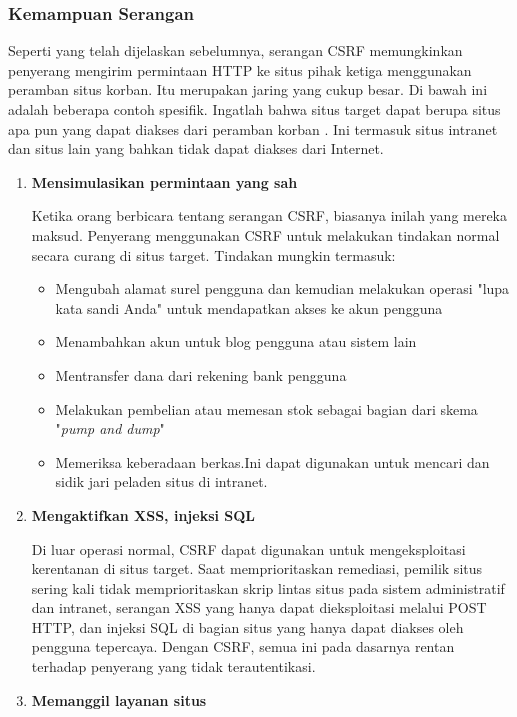 \documentclass{article}
\begin{document}
\begin{enumerate}
\end{enumerate}

\subsubsection{Kemampuan Serangan}
Seperti yang telah dijelaskan sebelumnya, serangan CSRF memungkinkan penyerang mengirim permintaan HTTP ke situs pihak ketiga menggunakan peramban situs korban. Itu merupakan jaring yang cukup besar. Di bawah ini adalah beberapa contoh spesifik. Ingatlah bahwa situs target dapat berupa situs apa pun yang dapat diakses dari peramban korban \cite{blatz2007csrf}. Ini termasuk situs intranet dan situs lain yang bahkan tidak dapat diakses dari Internet.
\begin{enumerate}
\item \textbf{Mensimulasikan permintaan yang sah}

Ketika orang berbicara tentang serangan CSRF, biasanya inilah yang mereka maksud. Penyerang menggunakan CSRF untuk melakukan tindakan normal secara curang di situs target. Tindakan mungkin termasuk: 
\begin{itemize}
\item Mengubah alamat surel pengguna dan kemudian melakukan operasi "lupa kata sandi Anda" untuk mendapatkan akses ke akun pengguna 
\item Menambahkan akun untuk blog pengguna atau sistem lain 
\item Mentransfer dana dari rekening bank pengguna 
\item Melakukan pembelian atau memesan stok sebagai bagian dari skema "\textit{pump and dump}" 
\item Memeriksa keberadaan berkas.Ini dapat digunakan untuk mencari dan sidik jari peladen situs di intranet.
\end{itemize}
\item \textbf{Mengaktifkan XSS, injeksi SQL}

Di luar operasi normal, CSRF dapat digunakan untuk mengeksploitasi kerentanan di situs target. Saat memprioritaskan remediasi, pemilik situs sering kali tidak memprioritaskan skrip lintas situs pada sistem administratif dan intranet, serangan XSS yang hanya dapat dieksploitasi melalui POST HTTP, dan injeksi SQL di bagian situs yang hanya dapat diakses oleh pengguna tepercaya. Dengan CSRF, semua ini pada dasarnya rentan terhadap penyerang yang tidak terautentikasi.
\item \textbf{Memanggil layanan situs}


\end{enumerate}
\end{document}
